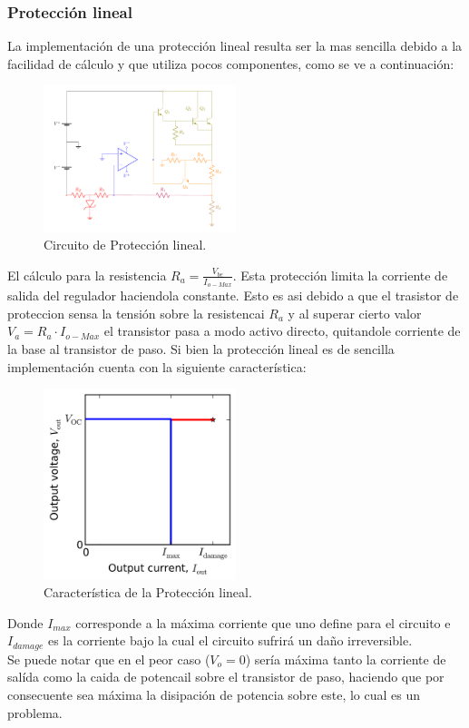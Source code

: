 \subsubsection{Protección lineal}
La implementación de una protección lineal resulta ser la mas sencilla debido a la facilidad de cálculo y que utiliza pocos componentes, como se ve a continuación:
\begin{figure}[H]
\centering
	\includegraphics[width=0.5\textwidth, page=3]{ImagenesEjercicio2/Regulador.pdf}
	\caption{Circuito de Protección lineal.}
	\label{fig:circuitolineal}
\end{figure}
El cálculo para la resistencia $R_a= \frac{V_{be}}{I_{o-Max}}$.
Esta protección limita la corriente de salida del regulador haciendola constante. Esto es asi debido a que el trasistor de proteccion sensa la tensión sobre la resistencai $R_a$ y al superar cierto valor $V_a = R_a \cdot I_{o-Max} $ el transistor pasa a modo activo directo, quitandole corriente de la base al transistor de paso.
Si bien la protección lineal es de sencilla implementación cuenta con la siguiente característica:
\begin{figure}[H]
\centering
	\includegraphics[width=0.5\textwidth]{ImagenesEjercicio2/Linearprotection.png}
	\caption{Característica de la Protección lineal.}
	\label{fig:circuitolinealcarac}
\end{figure}
Donde $I_{max}$ corresponde a la máxima corriente que uno define para el circuito e $I_{damage}$ es la corriente bajo la cual el circuito sufrirá un daño irreversible.\\
Se puede notar que en el  peor caso ($V_o = 0$) sería máxima tanto la corriente de salída como la caida de potencail sobre el transistor de paso, haciendo que por consecuente sea máxima la disipación de potencia sobre este, lo cual es un problema.
